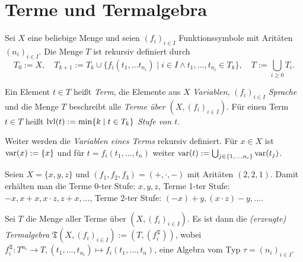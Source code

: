 \section{Terme und Termalgebra}

\begin{definition}
    Sei $X$ eine beliebige Menge und seien $(f_i)_{i \in I}$ Funktionssymbole mit Aritäten $(n_i)_{i \in I}$. Die Menge $T$ ist rekursiv definiert durch $$T_0 := X ,\quad T_{k+1} := T_k \cup \{f_i(t_1, \ldots t_{n_i}) \mid i \in I \land t_1, \ldots, t_{n_i} \in T_k\},\quad T := \bigcup_{i \ge 0} T_i.$$ 
    
    Ein Element $t \in T$ heißt \emph{Term}, die Elemente aus $X$ \emph{Variablen}, $(f_i)_{i \in I}$ \emph{Sprache} und die Menge $T$ beschreibt alle \emph{Terme über $(X, (f_i)_{i \in I})$}.
    Für einen Term $t \in T$ heißt $\operatorname{lvl}(t) := \min\{k \mid t \in T_k\}$ \emph{Stufe von $t$}. 
    
    Weiter werden die \emph{Variablen eines Terms} rekursiv definiert. Für $x \in X$ ist $\operatorname{var}(x) := \{x\}$ und für $t = f_i(t_1, \ldots, t_n)$ weiter $\operatorname{var}(t) := \bigcup_{j \in \{1, \ldots, n_i\}} \operatorname{var}(t_j)$.
\end{definition}

\begin{example}
    Seien $X = \{x,y,z\}$ und $(f_1, f_2, f_3) = (+, \cdot, -)$ mit Aritäten $(2,2,1)$. Damit erhälten man die Terme 0-ter Stufe: $x, y, z$, Terme 1-ter Stufe: $-x, x+x, x\cdot z, z + x, \ldots$, Terme 2-ter Stufe: $(-x) + y, (x \cdot z) - y, \ldots$.
\end{example}

\begin{definition}
    Sei $T$ die Menge aller Terme über $(X, (f_i)_{i \in I})$. Es ist dann die \emph{(erzeugte) Termalgebra} $\mathfrak{T}(X, (f_i)_{i \in I}) := (T, (f_i^\mathfrak{T}))$, wobei $f_i^\mathfrak{T}: T^{n_i} \to T, (t_1, \ldots, t_{n_i}) \mapsto f_i(t_1, \ldots, t_n)$, eine Algebra vom Typ $\tau = (n_i)_{i \in I}$.
\end{definition}

